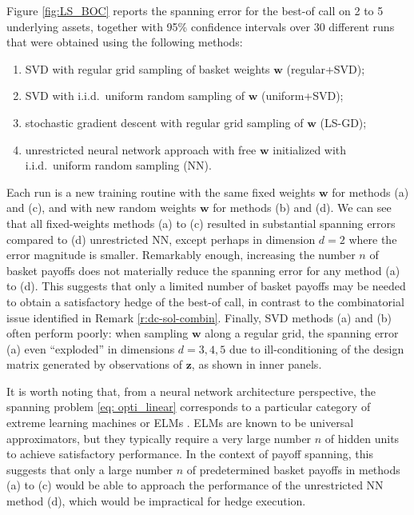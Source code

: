 \documentclass[11pt,A4,twoside]{article}
\numberwithin{equation}{section}
\renewcommand{\vec}{\mathbf}
\theoremstyle{definition}
\theoremstyle{remark}
\def\then{l}\def\then{n}%
\begin{document}
Figure \ref{fig:LS_BOC} reports the spanning error for the best-of call on 2 to 5 underlying assets, together with 95\% confidence intervals over 30 different runs
that were obtained using the following methods:  
\begin{enumerate}[label=(\alph*),leftmargin=*,topsep=0pt,itemsep=1pt,partopsep=0pt,parsep=0pt,listparindent=0pt]
    \item SVD with regular grid sampling of basket weights $\vec w$ (regular+SVD);
    \item SVD with i.i.d.\  uniform random sampling of $\vec w$ (uniform+SVD);
    \item stochastic gradient descent with regular grid sampling of $\vec w$ (LS-GD);
    \item unrestricted neural network approach with free $\vec w$ initialized with i.i.d.\  uniform random sampling (NN).
\end{enumerate}
Each run is a new training routine with the same fixed weights $\vec w$ for methods (a) and (c), and with new random weights $\vec w$ for methods (b) and (d). We can see that all fixed-weights methods (a) to (c) resulted in substantial spanning errors compared to (d) unrestricted NN, except perhaps in dimension $d = 2$ where the error magnitude is smaller. Remarkably enough, increasing the number $\then$ of basket payoffs does not materially reduce the spanning error for any method (a) to (d). This suggests that only a limited number of basket payoffs may be needed to obtain a satisfactory hedge of the best-of call, in contrast to the combinatorial issue identified in Remark \ref{r:dc-sol-combin}.  Finally, SVD methods (a) and (b) often perform poorly: when sampling $\vec w$ along a regular grid, the spanning error (a) even ``exploded'' in dimensions $d=3,4,5$ due to ill-conditioning of the design matrix generated by observations of $\vec z$, as shown in inner panels.


It is worth noting that, from a neural network architecture perspective, the spanning problem \eqref{eq: opti_linear} corresponds to a particular category of extreme learning machines or ELMs \citep*{huang2004extreme,huang2006extreme}.  ELMs are known to be universal approximators, but they typically require a very large number $\then$ of hidden units to achieve satisfactory performance.  In the context of payoff spanning, this suggests that only a large number $\then$ of predetermined basket payoffs in methods (a) to (c) would be able to approach the performance of the unrestricted NN method (d), which would be impractical for hedge execution.
\end{document}
